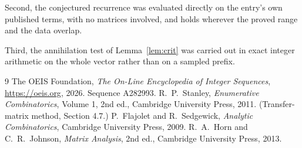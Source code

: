 \documentclass[11pt,a4paper]{article}
\theoremstyle{plain}
\theoremstyle{definition}
\begin{document}
Second, the conjectured recurrence was evaluated directly on the entry's own published terms,
with no matrices involved, and holds wherever the proved range and the data overlap.

Third, the annihilation test of Lemma~\ref{lem:crit} was carried out in exact integer
arithmetic on the whole vector rather than on a sampled prefix.

\begin{thebibliography}{9}
 The OEIS Foundation, \emph{The On-Line Encyclopedia of Integer
Sequences}, \url{https://oeis.org}, 2026. Sequence A282993.
 R.~P.~Stanley, \emph{Enumerative Combinatorics}, Volume 1, 2nd ed.,
Cambridge University Press, 2011. (Transfer-matrix method, Section 4.7.)
 P.~Flajolet and R.~Sedgewick, \emph{Analytic Combinatorics}, Cambridge
University Press, 2009.
 R.~A.~Horn and C.~R.~Johnson, \emph{Matrix Analysis}, 2nd ed., Cambridge
University Press, 2013.
\end{thebibliography}
\end{document}
